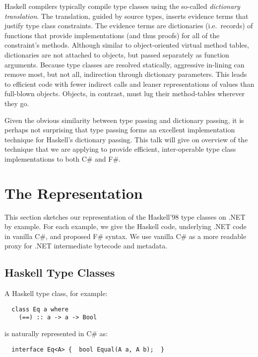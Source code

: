 \documentclass{elsarticle}
\begin{document}
Haskell compilers typically compile type classes using the so-called
\emph{dictionary translation}.  The translation, guided by source
types, inserts evidence terms that justify type class constraints. The evidence terms are dictionaries (i.e.\ records) of functions that provide implementations (and thus proofs) for all of the constraint's methods. Although similar to
object-oriented virtual method tables, dictionaries are not attached to
objects, but passed separately as function arguments.  Because type
classes are resolved statically, aggressive in-lining can remove most,
but not all, indirection through dictionary parameters. This leads to
efficient code with fewer indirect calls and leaner representations of values than full-blown objects. Objects, in contrast, must lug their method-tables wherever they go.

Given the obvious similarity between type passing and dictionary
passing, it is perhaps not surprising that type passing forms an
excellent implementation technique for Haskell's dictionary passing. 
This talk will give on overview of the technique that we are applying to provide
efficient, inter-operable type class implementations to both C\# and F\#.


\section{The Representation}

This section sketches our representation of the Haskell'98 type classes on .NET by example.
For each example, we give the Haskell code, underlying .NET code in vanilla C\#, and proposed F\# syntax.
We use vanilla C\# as a more readable proxy for .NET intermediate bytecode and metadata.

\subsection{Haskell Type Classes}

A Haskell type class, for example:

{
\small
{}
\begin{lstlisting}
  class Eq a where 
    (==) :: a -> a -> Bool
\end{lstlisting}}
\noindent is naturally represented in C\# as:
\begin{lstlisting}
  interface Eq<A> {  bool Equal(A a, A b);  }
\end{lstlisting}
\end{document}
